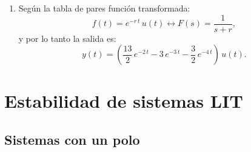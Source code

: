 \documentclass[11pt,a4paper,openany]{book}
\begin{document}
\begin{enumerate}
	\item Según la tabla de pares función transformada:
	\begin{equation}
		f(t) = e^{-r \, t} \, u(t) \leftrightarrow F(s) = \frac{1}{s+r},
	\end{equation}
	y por lo tanto la salida es:
	\begin{equation}
		y(t) = \left(\frac{13}{2} \, e^{-2 \, t} - 3 \, e^{-3 \, t} - \frac{3}{2} \, e^{-4 \, t}\right) \, u(t).
	\end{equation}
\end{enumerate}

\section{Estabilidad de sistemas LIT}

\subsection{Sistemas con un polo}
\end{document}
